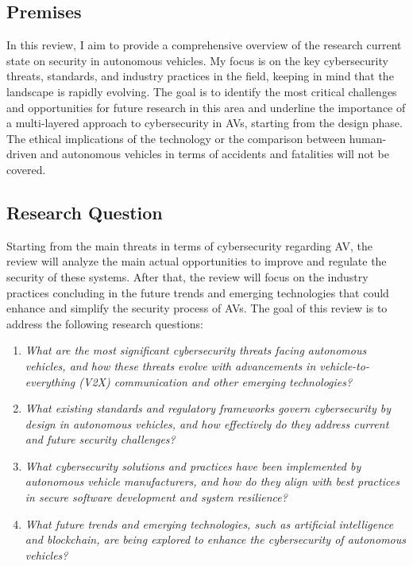 \subsection{Premises}\label{subsec:premises}

In this review,
I aim to provide a comprehensive overview of the research current state on security in autonomous vehicles.
My focus is on the key cybersecurity threats, standards, and industry practices in the field,
keeping in mind that the landscape is rapidly evolving.
The goal is to identify the most critical challenges and opportunities for future research in this area
and underline the importance of a multi-layered approach to cybersecurity in AVs, starting from the design phase.
The ethical implications of the technology or the comparison between human-driven and autonomous vehicles in terms of accidents and fatalities will not be covered.

\subsection{Research Question}\label{subsec:research-question}

Starting from the main threats in terms of cybersecurity regarding AV, the review will analyze the main actual opportunities to improve and regulate the security of these systems.
After that, the review will focus on the industry practices concluding in the future trends and emerging technologies that could enhance and simplify the security process of AVs.
The goal of this review is to address the following research questions:

\begin{enumerate}
    \item \textit{What are the most significant cybersecurity threats facing autonomous vehicles, and how these threats evolve with advancements in vehicle-to-everything (V2X) communication and other emerging technologies?}
    \item \textit{What existing standards and regulatory frameworks govern cybersecurity by design in autonomous vehicles, and how effectively do they address current and future security challenges?}
    \item \textit{What cybersecurity solutions and practices have been implemented by autonomous vehicle manufacturers, and how do they align with best practices in secure software development and system resilience?}
    \item \textit{What future trends and emerging technologies, such as artificial intelligence and blockchain, are being explored to enhance the cybersecurity of autonomous vehicles?}
\end{enumerate}


